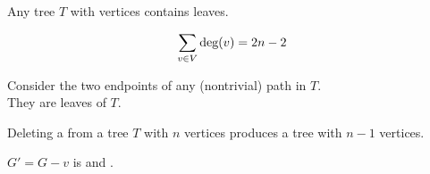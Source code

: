 \begin{frame}{}
  \begin{lemma}
    Any tree $T$ with  vertices contains  leaves.
  \end{lemma}

  \pause
  \vspace{0.30cm}
  \[
    \sum_{v \in V} \text{deg}(v) = 2n - 2
  \]

  \pause
  \vspace{0.50cm}
  \begin{center}
    Consider the two endpoints of any  (nontrivial) path in $T$.
    \pause \\[5pt]
    They are leaves of $T$.
  \end{center}
\end{frame}

\begin{frame}{}
  \begin{lemma}
    Deleting a  from a tree $T$ with $n$ vertices
    produces a tree with $n-1$ vertices.
  \end{lemma}

  \pause
  \vspace{0.30cm}
  \begin{center}

    \vspace{0.20cm}
    $G' = G - v$ is  and .

    \pause
    \vspace{0.50cm}

    \pause
    \vspace{0.80cm}
  \end{center}
\end{frame}

